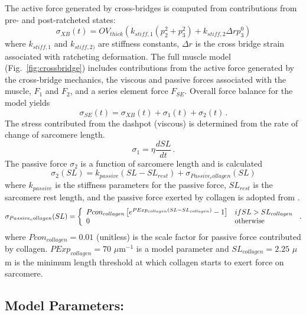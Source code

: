 \documentclass[fleqn,10pt]{physiome}
\begin{document}
The active force generated by cross-bridges is computed from contributions from pre- and post-ratcheted states:
\begin{equation}\label{eq:activeforce}
  \sigma_{XB} (t) = OV_{thick} ( k_{stiff,1}  \left(p_2^2 + p_3^2 \right) + k_{stiff,2} \Delta r p_3^0 )
\end{equation}
where $k_{stiff,1}$ and $k_{stiff,2)}$ are stiffness constants, $\Delta r$ is the cross bridge strain associated with ratcheting deformation.
The full muscle model (Fig.~\ref{fig:crossbridge}) includes contributions from the active force generated by the cross-bridge mechanics, the viscous and passive forces associated with the muscle, $F_1$ and $F_2$, and a series element force $F_{SE}$. Overall force balance for the model yields
\begin{equation}\label{eq:totalforce}
  \sigma_{SE} (t) = \sigma_{XB} (t) + \sigma_1 (t) + \sigma_2 (t) \, .
\end{equation}
The stress contributed from the dashpot (viscous) is determined from the rate of change of sarcomere length.
\begin{equation}\label{eq:viscosity}
  \sigma_1 = \eta \frac{dSL}{dt} \, .
\end{equation}
The passive force $\sigma_2$ is a function of sarcomere length and is calculated 
\begin{equation}
  \sigma_2 (SL)= k_{passive}  \left(SL - SL_{rest} \right) + \sigma_{Passive_collagen} (SL)
\end{equation}
where $k_{passive}$ is the stiffness parameters for the passive force, $SL_{rest}$ is the sarcomere rest length, and the passive force exerted by collagen is adopted from \cite{Rice2008}.
\begin{eqnarray}
  \sigma_{Passive_collagen} (SL) = \left\{ \begin{array}{ll} 
    Pcon_{collagen} \left[ e^{PExp_{collagen}(SL - SL_{collagen})} -1 \right] &  if SL > SL_{collagen} \\ 
    0 & {\rm otherwise} \end{array} \right. \, .
\end{eqnarray}
where $Pcon_{collagen} = 0.01$ (unitless) is the scale factor for passive force contributed by collagen. 
$PExp_{collagen} = 70$ $\mu$m$^{-1}$ is a model parameter and $SL_{collagen} = 2.25$ $\mu$m is the minimum length threshold at which collagen starts to exert force on sarcomere.
 
\subsection{Model Parameters:}
\end{document}
